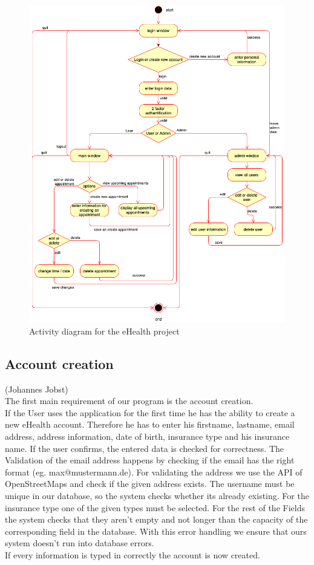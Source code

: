 \documentclass[a4paper, 12pt]{report}
\begin{document}
\begin{figure}[!h]
	\includegraphics[width=\linewidth]{eHealth_Activity.png}
	\caption{Activity diagram for the eHealth project}
\end{figure}

\subsection{Account creation}
{\tiny (Johannes Jobst)\\}
The first main requirement of our program is the account creation.\\
If the User uses the application for the first time he has the ability to create a new eHealth account. Therefore he has to enter his firstname, lastname, email address, address information, date of birth, insurance type and his insurance name.
If the user confirms, the entered data is checked for correctness.
The Validation of the email address happens by checking if the email has the right format (eg. max@mustermann.de). For validating the address we use the API of OpenStreetMaps and check if the given address exists.
The username must be unique in our database, so the system checks whether its already existing. For the insurance type one of the given types must be selected.
For the rest of the Fields the system checks that they aren't empty and not longer than the capacity of the corresponding field in the database.
With this error handling we ensure that ours system doesn't run into database errors.\\
If every information is typed in correctly the account is now created.
\end{document}
